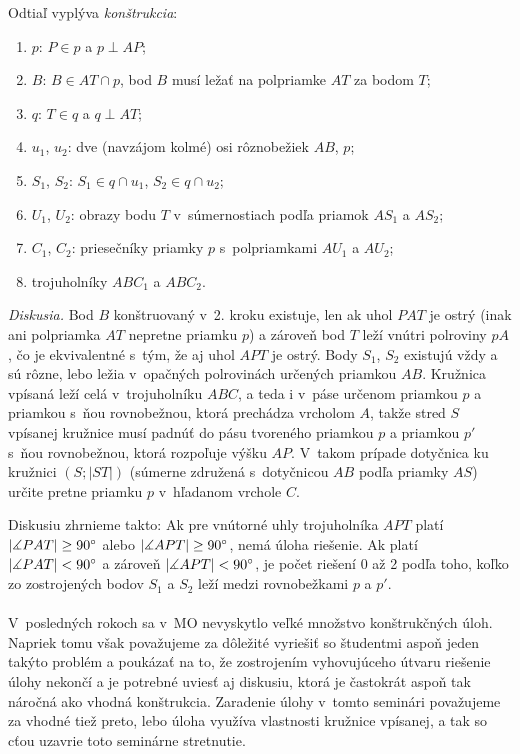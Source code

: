 Odtiaľ vyplýva \textit{konštrukcia}:
\begin{enumerate}
\item $p$: $P \in p$ a $p \perp AP$;
\item $B$: $B \in AT \cap p$, bod $B$ musí ležať na polpriamke $AT$ za bodom $T$;
\item $q$: $T \in q$ a $q \perp AT$;
\item $u_1$, $u_2$: dve (navzájom kolmé) osi rôznobežiek $AB$, $p$;
\item $S_1$, $S_2$: $S_1 \in q \cap u_1$, $S_2 \in q \cap u_2$;
\item $U_1$, $U_2$: obrazy bodu $T$ v~súmernostiach podľa priamok $AS_1$ a $AS_2$;
\item $C_1$, $C_2$: priesečníky priamky $p$ s~polpriamkami $AU_1$ a $AU_2$;
\item trojuholníky $ABC_1$ a $ABC_2$.
\end{enumerate}
\textit{Diskusia.} Bod $B$ konštruovaný v~2. kroku existuje, len ak uhol $PAT$ je ostrý (inak ani polpriamka $AT$ nepretne priamku $p$) a zároveň bod $T$ leží vnútri polroviny $pA$, čo je ekvivalentné s~tým, že aj uhol $APT$ je ostrý. Body $S_1$, $S_2$ existujú vždy a sú rôzne, lebo ležia v~opačných polrovinách určených priamkou $AB$. Kružnica vpísaná leží celá v~trojuholníku $ABC$, a teda i v~páse určenom priamkou $p$ a priamkou s~ňou rovnobežnou, ktorá prechádza vrcholom $A$, takže stred $S$ vpísanej kružnice musí padnúť do pásu tvoreného priamkou $p$ a priamkou $p'$ s~ňou rovnobežnou, ktorá rozpoľuje výšku $AP$. V~takom prípade dotyčnica ku kružnici $(S; |ST|)$ (súmerne združená s~dotyčnicou $AB$ podľa priamky $AS$) určite pretne priamku $p$ v~hľadanom vrchole $C$.

Diskusiu zhrnieme takto: Ak pre vnútorné uhly trojuholníka $APT$ platí $|\measuredangle PAT| \geq 90^\circ$ alebo $|\measuredangle APT| \geq 90^\circ$, nemá úloha riešenie. Ak platí $|\measuredangle PAT| < 90^\circ$ a zároveň $|\measuredangle APT| < 90^\circ$, je počet riešení 0 až 2 podľa toho, koľko zo zostrojených bodov $S_1$ a $S_2$ leží medzi rovnobežkami $p$ a $p'$.\\
\\
\kom V~posledných rokoch sa v~MO nevyskytlo veľké množstvo konštrukčných úloh. Napriek tomu však považujeme za dôležité vyriešiť so študentmi aspoň jeden takýto problém a poukázať na to, že zostrojením vyhovujúceho útvaru riešenie úlohy nekončí a je potrebné uviesť aj diskusiu, ktorá je častokrát aspoň tak náročná ako vhodná konštrukcia. Zaradenie úlohy v~tomto seminári považujeme za vhodné tiež preto, lebo úloha využíva vlastnosti kružnice vpísanej, a tak so cťou uzavrie toto seminárne stretnutie.

